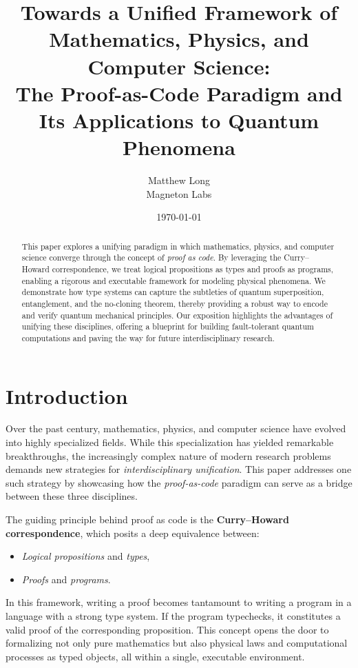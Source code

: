 \documentclass[12pt]{article}
\title{\bf Towards a Unified Framework of Mathematics, Physics, and Computer Science:\\
The Proof-as-Code Paradigm and Its Applications to Quantum Phenomena}
\author{Matthew Long \\
Magneton Labs}
\date{\today}
\begin{document}
\maketitle

\begin{abstract}
This paper explores a unifying paradigm in which mathematics, physics, and computer science converge through the concept of \emph{proof as code}. By leveraging the Curry--Howard correspondence, we treat logical propositions as types and proofs as programs, enabling a rigorous and executable framework for modeling physical phenomena. We demonstrate how type systems can capture the subtleties of quantum superposition, entanglement, and the no-cloning theorem, thereby providing a robust way to encode and verify quantum mechanical principles. Our exposition highlights the advantages of unifying these disciplines, offering a blueprint for building fault-tolerant quantum computations and paving the way for future interdisciplinary research.
\end{abstract}

\tableofcontents

\newpage

\section{Introduction}
\label{sec:intro}
Over the past century, mathematics, physics, and computer science have evolved into highly specialized fields. While this specialization has yielded remarkable breakthroughs, the increasingly complex nature of modern research problems demands new strategies for \emph{interdisciplinary unification}. This paper addresses one such strategy by showcasing how the \emph{proof-as-code} paradigm can serve as a bridge between these three disciplines.

The guiding principle behind proof as code is the \textbf{Curry--Howard correspondence}, which posits a deep equivalence between:
\begin{itemize}[label=$\bullet$]
    \item \emph{Logical propositions} and \emph{types},
    \item \emph{Proofs} and \emph{programs}.
\end{itemize}
In this framework, writing a proof becomes tantamount to writing a program in a language with a strong type system. If the program typechecks, it constitutes a valid proof of the corresponding proposition. This concept opens the door to formalizing not only pure mathematics but also physical laws and computational processes as typed objects, all within a single, executable environment.
\end{document}
